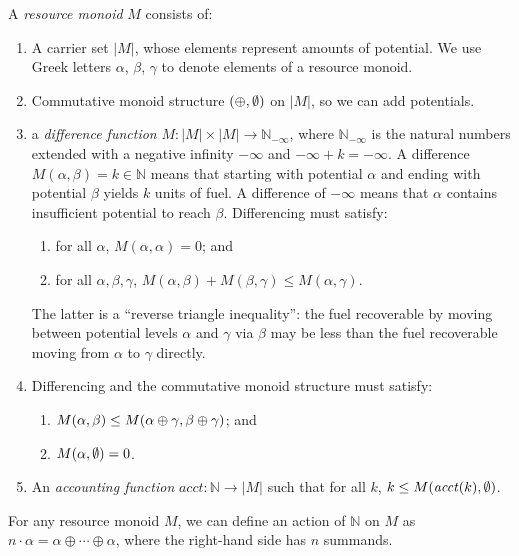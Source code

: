 \documentclass[acmsmall,review,screen,anonymous]{acmart}
\newcommand{\natinf}{\mathbb{N}_{-\infty}}
\begin{document}
\begin{definition}
  A \emph{resource monoid} $M$ consists of:
  \begin{enumerate}
  \item A carrier set $|M|$, whose elements represent amounts of
    potential. We use Greek letters $\alpha$, $\beta$, $\gamma$ to
    denote elements of a resource monoid.
  \item Commutative monoid structure $(\oplus,\emptyset)$ on $|M|$, so
    we can add potentials.
  \item a \emph{difference function} $M : |M| \times |M| \to \natinf$,
    where $\natinf$ is the natural numbers extended with a negative
    infinity $- \infty$ and $- \infty + k = -\infty$. A difference
    $M(\alpha, \beta) = k \in \mathbb{N}$ means that starting with
    potential $\alpha$ and ending with potential $\beta$ yields $k$
    units of fuel. A difference of $- \infty$ means that $\alpha$
    contains insufficient potential to reach $\beta$. Differencing
    must satisfy:
    \begin{enumerate}
    \item for all $\alpha$, $M(\alpha,\alpha) = 0$; and
    \item for all $\alpha, \beta, \gamma$,
      $M(\alpha, \beta) + M(\beta, \gamma) \leq M(\alpha, \gamma)$.
    \end{enumerate}
    The latter is a ``reverse triangle inequality'': the fuel
    recoverable by moving between potential levels $\alpha$ and
    $\gamma$ via $\beta$ may be less than the fuel recoverable
    moving from $\alpha$ to $\gamma$ directly.
  \item Differencing and the commutative monoid structure must satisfy:
    \begin{enumerate}
    \item $M(\alpha, \beta) \leq M(\alpha \oplus \gamma, \beta \oplus \gamma)$; and
    \item $M(\alpha, \emptyset) = 0$.
    \end{enumerate}
  \item An \emph{accounting function}
    $\mathit{acct} : \mathbb{N} \to |M|$ such that for all $k$,
    $k \leq M(\mathit{acct}(k),\emptyset)$.
  \end{enumerate}
\end{definition}

For any resource monoid $M$, we can define an action of $\mathbb{N}$
on $M$ as $n \cdot \alpha = \alpha \oplus \cdots \oplus \alpha$, where
the right-hand side has $n$ summands.
\end{document}
